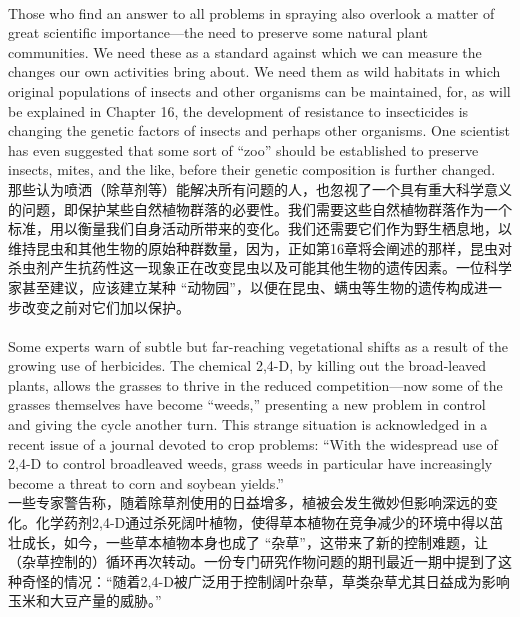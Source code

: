 \documentclass{article}
\begin{document}
\\
Those who find an answer to all problems in spraying also overlook a matter of great scientific importance—the need to preserve some natural plant communities. We need these as a standard against which we can measure the changes our own activities bring about. We need them as wild habitats in which original populations of insects and other organisms can be maintained, for, as will be explained in Chapter 16, the development of resistance to insecticides is changing the genetic factors of insects and perhaps other organisms. One scientist has even suggested that some sort of “zoo” should be established to preserve insects, mites, and the like, before their genetic composition is further changed.\\
那些认为喷洒（除草剂等）能解决所有问题的人，也忽视了一个具有重大科学意义的问题，即保护某些自然植物群落的必要性。我们需要这些自然植物群落作为一个标准，用以衡量我们自身活动所带来的变化。我们还需要它们作为野生栖息地，以维持昆虫和其他生物的原始种群数量，因为，正如第16章将会阐述的那样，昆虫对杀虫剂产生抗药性这一现象正在改变昆虫以及可能其他生物的遗传因素。一位科学家甚至建议，应该建立某种 “动物园”，以便在昆虫、螨虫等生物的遗传构成进一步改变之前对它们加以保护。 \\

\\
Some experts warn of subtle but far-reaching vegetational shifts as a result of the growing use of herbicides. The chemical 2,4-D, by killing out the broad-leaved plants, allows the grasses to thrive in the reduced competition—now some of the grasses themselves have become “weeds,” presenting a new problem in control and giving the cycle another turn. This strange situation is acknowledged in a recent issue of a journal devoted to crop problems: “With the widespread use of 2,4-D to control broadleaved weeds, grass weeds in particular have increasingly become a threat to corn and soybean yields.”\\
一些专家警告称，随着除草剂使用的日益增多，植被会发生微妙但影响深远的变化。化学药剂2,4-D通过杀死阔叶植物，使得草本植物在竞争减少的环境中得以茁壮成长，如今，一些草本植物本身也成了 “杂草”，这带来了新的控制难题，让（杂草控制的）循环再次转动。一份专门研究作物问题的期刊最近一期中提到了这种奇怪的情况：“随着2,4-D被广泛用于控制阔叶杂草，草类杂草尤其日益成为影响玉米和大豆产量的威胁。” \\
\end{document}
